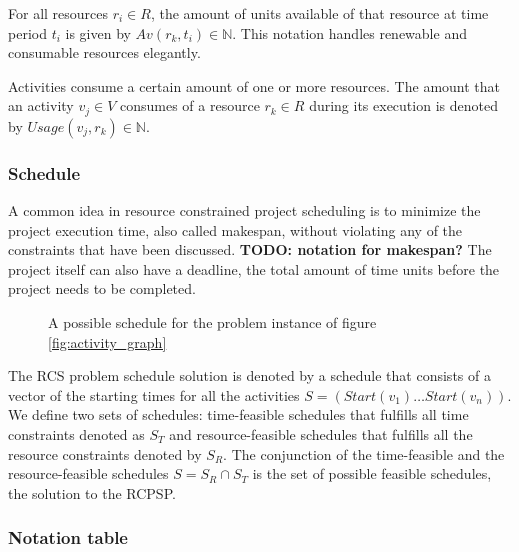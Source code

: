 \documentclass{article}
\newcommand{\TODO}[1]{{\color{red}\textbf{TODO: #1}}}
\newcommand{\res}[0]{R} %
\newcommand{\av}[1]{\textit{Av}(#1)} %
\newcommand{\usage}[1]{\textit{Usage}(#1)} %
\newcommand{\start}[1]{\textit{Start}(#1)} %
\begin{document}
For all resources $r_i \in \res$, the amount of units available of that resource at time period $t_i$ is given by $\av{r_k, t_i} \in \mathbb{N}$. 
This notation handles renewable and consumable resources elegantly. 

Activities consume a certain amount of one or more resources.
The amount that an activity $v_j \in V$ consumes of a resource $r_k \in \res$ during its execution is denoted by $\usage{v_j, r_k} \in \mathbb{N}$. 

\subsubsection{Schedule}
A common idea in resource constrained project scheduling is to minimize the project execution time, also called makespan, without violating any of the constraints that have been discussed. 
\TODO{notation for makespan?}
The project itself can also have a deadline, the total amount of time units before the project needs to be completed.

\begin{figure}[h]
	\centering
	
	\caption{A possible schedule for the problem instance of figure \ref{fig:activity_graph}}
	\label{fig:time_schedule}
\end{figure}

The RCS problem schedule solution is denoted by a schedule that consists of a vector of the starting times for all the activities $S =  (\start{v_1} \ldots \start{v_n})$.
We define two sets of schedules: time-feasible schedules that fulfills all time constraints denoted as $S_T$ and resource-feasible schedules that fulfills all the resource constraints denoted by $S_R$. 
The conjunction of the time-feasible and the resource-feasible schedules $S = S_R \cap S_T$ is the set of possible feasible schedules, the solution to the RCPSP. 

\subsubsection{Notation table}
\end{document}
